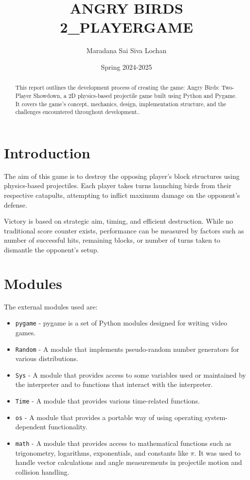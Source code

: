 \documentclass[10pt]{article}
\title{ANGRY BIRDS \\ 2\_PLAYERGAME }
\author{Maradana Sai Siva Lochan }
\date{Spring 2024-2025}
\begin{document}
    \maketitle

    \begin{abstract}
        This report outlines the development process of creating the game: Angry Birds: Two-Player Showdown, a 2D physics-based projectile game built using Python and Pygame.
        It covers the game’s concept, mechanics, design, implementation structure, and the challenges encountered throughout development..
    \end{abstract}

    \tableofcontents
    \newpage


    \section{Introduction}
    The aim of this game is to destroy the opposing player's block structures using physics-based projectiles. Each player takes turns launching birds from their respective catapults, attempting to inflict maximum damage on the opponent’s defense.

    Victory is based on strategic aim, timing, and efficient destruction. While no traditional score counter exists, performance can be measured by factors such as number of successful hits, remaining blocks, or number of turns taken to dismantle the opponent's setup.


    \section{Modules}\label{sec:modules}
    The external modules used are:
    \begin{itemize}
        \item \texttt{pygame} - pygame is a set of Python modules designed for writing video games.
        \item \texttt{Random} - A module that implements pseudo-random number generators for various distributions.
        \item \texttt{Sys} - A module that provides access to some variables used or maintained by the interpreter and to functions that interact with the interpreter.
        \item \texttt{Time} - A module that provides various time-related functions.
        \item \texttt{os} - A module that provides a portable way of using operating system-dependent functionality.
        \item \texttt{math} - A module that provides access to mathematical functions such as trigonometry, logarithms, exponentials, and constants like $\pi$. It was used to handle vector calculations and angle measurements in projectile motion and collision handling.
    \end{itemize}
\end{document}
